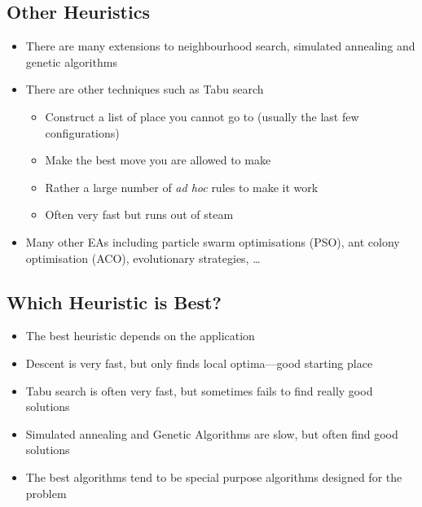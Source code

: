 

\begin{slide}
\section[-2]{Other Heuristics}

\begin{PauseHighLight}
  \begin{itemize}
  \item There are many extensions to neighbourhood search, simulated
    annealing and genetic algorithms\pause
  \item There are other techniques such as Tabu search
    \begin{itemize}
    \item Construct a list of place you cannot go to (usually the last
      few configurations)\pause
    \item Make the best move you are allowed to make\pause
    \item Rather a large number of \textit{ad hoc} rules to make it
      work\pause
    \item Often very fast but runs out of steam\pause
    \end{itemize}
  \item Many other EAs including particle swarm optimisations (PSO), ant
    colony optimisation (ACO), evolutionary strategies, \ldots\pause
  \end{itemize}
\end{PauseHighLight}

\end{slide}



\begin{slide}
\section{Which Heuristic is Best?}

\begin{PauseHighLight}
  \begin{itemize}
  \item The best heuristic depends on the application\pause
  \item Descent is very fast, but only finds local optima---good
    starting place\pause
  \item Tabu search is often very fast, but sometimes fails to find
    really good solutions\pause
  \item Simulated annealing and Genetic Algorithms are slow, but often
    find good solutions\pause
  \item The best algorithms tend to be special purpose algorithms
    designed for the problem\pause
  \end{itemize}
\end{PauseHighLight}

\end{slide}

